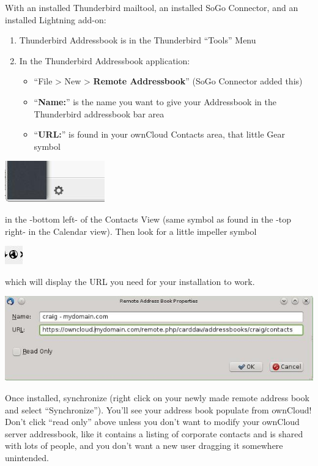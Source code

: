 \documentclass[letterpaper,10pt,english]{sphinxmanual}
\begin{document}
With an installed Thunderbird mailtool, an installed SoGo Connector, and an installed Lightning add-on:
\begin{enumerate}
\item {} 
Thunderbird Addressbook is in the Thunderbird ``Tools'' Menu

\item {} 
In the Thunderbird Addressbook application:
\begin{itemize}
\item {} 
``File \textgreater{} New \textgreater{} \textbf{Remote Addressbook}'' (SoGo Connector added this)

\item {} 
``\textbf{Name:}'' is the name you want to give your Addressbook in the Thunderbird addressbook bar area

\item {} 
``\textbf{URL:}'' is found in your ownCloud Contacts area, that little Gear symbol

\end{itemize}

\end{enumerate}

\includegraphics{contact_thunderbird-Symbol_Gear.jpg}

in the -bottom left- of the Contacts View (same symbol as found in the -top right- in the Calendar view). Then look for a little impeller symbol

\includegraphics{contact_thunderbird-Symbol_Impeller.jpg}

which will display the URL you need for your installation to work.

\includegraphics{contact_thunderbird-URL_config.jpg}

Once installed, synchronize (right click on your newly made remote address book and select ``Synchronize'').
You'll see your address book populate from ownCloud! Don't click ``read only'' above unless you don't want to
modify your ownCloud server addressbook, like it contains a listing of corporate contacts and is shared with
lots of people, and you don't want a new user dragging it somewhere unintended.
\end{document}

